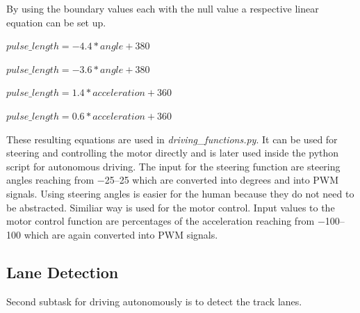 \documentclass[conference]{IEEEtran}
\begin{document}
By using the boundary values each with the null value a respective linear equation can be set up.
\begin{description}
\setlength\itemsep{.25em}
\item[Left] $ pulse\_length = -4.4 * angle + 380 $
\item[Right] $ pulse\_length = -3.6 * angle + 380 $
\item[Forwards] $ pulse\_length = 1.4 * acceleration + 360 $
\item[Backwards] $ pulse\_length = 0.6 * acceleration + 360 $
\end{description}
These resulting equations are used in \textit{driving\_functions.py}.
It can be used for steering and controlling the motor directly and is later used inside the python script for autonomous driving.
The input for the steering function are steering angles reaching from \numrange{-25}{25} which are converted into degrees and into PWM signals.
Using steering angles is easier for the human because they do not need to be abstracted.
Similiar way is used for the motor control.
Input values to the motor control function are percentages of the acceleration reaching from \numrange{-100}{100} which are again converted into PWM signals.

\subsection{Lane Detection}

Second subtask for driving autonomously is to detect the track lanes.
\end{document}
